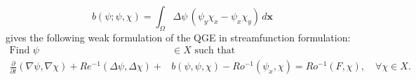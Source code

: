 \begin{equation}
  b(\psi; \psi, \chi) = \int_{\Omega}\! \Delta \psi\, (\psi_y \chi_x - \psi_x
  \chi_y)\, d\mathbf{x}
  \label{eqn:b}
\end{equation}
gives the following weak
formulation of the QGE in streamfunction formulation:
\begin{equation}
  \begin{split}
    \text{Find } \psi &\in X \text{ such that} \\
    \frac{\partial}{\partial t} (\nabla \psi, \nabla \chi) + Re^{-1} (\Delta
      \psi, \Delta \chi) +& b(\psi,\psi,\chi) - Ro^{-1}(\psi_x,\chi)
      = Ro^{-1} (F,\chi),\quad \forall \chi \in X.
  \end{split}
  \label{eqn:QGEWF}
\end{equation}
